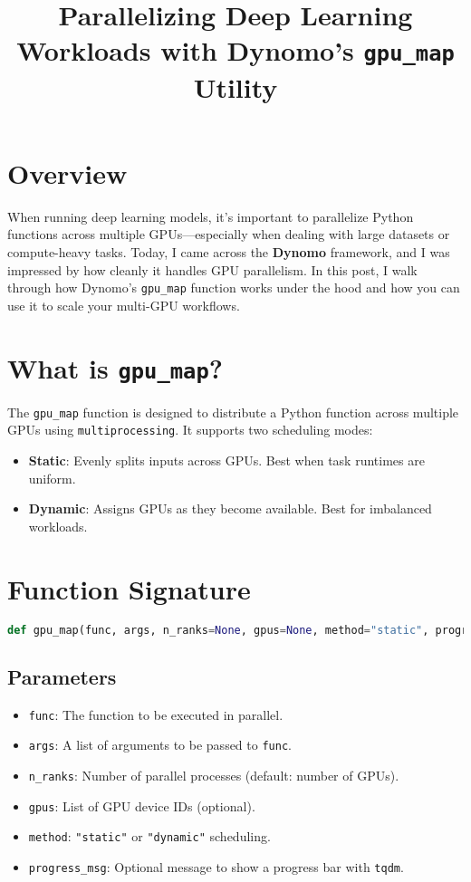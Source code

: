 \documentclass{article}
\title{Parallelizing Deep Learning Workloads with Dynomo's \texttt{gpu\_map} Utility}
\author{}
\date{}
\begin{document}
\maketitle

\section*{Overview}

When running deep learning models, it's important to parallelize Python functions across multiple GPUs—especially when dealing with large datasets or compute-heavy tasks. Today, I came across the \textbf{Dynomo} framework, and I was impressed by how cleanly it handles GPU parallelism. In this post, I walk through how Dynomo's \texttt{gpu\_map} function works under the hood and how you can use it to scale your multi-GPU workflows.

\section*{What is \texttt{gpu\_map}?}

The \texttt{gpu\_map} function is designed to distribute a Python function across multiple GPUs using \texttt{multiprocessing}. It supports two scheduling modes:

\begin{itemize}
  \item \textbf{Static}: Evenly splits inputs across GPUs. Best when task runtimes are uniform.
  \item \textbf{Dynamic}: Assigns GPUs as they become available. Best for imbalanced workloads.
\end{itemize}

\section*{Function Signature}

\begin{lstlisting}[language=Python]
def gpu_map(func, args, n_ranks=None, gpus=None, method="static", progress_msg=None):
\end{lstlisting}

\subsection*{Parameters}

\begin{itemize}
  \item \texttt{func}: The function to be executed in parallel.
  \item \texttt{args}: A list of arguments to be passed to \texttt{func}.
  \item \texttt{n\_ranks}: Number of parallel processes (default: number of GPUs).
  \item \texttt{gpus}: List of GPU device IDs (optional).
  \item \texttt{method}: \texttt{"static"} or \texttt{"dynamic"} scheduling.
  \item \texttt{progress\_msg}: Optional message to show a progress bar with \texttt{tqdm}.
\end{itemize}
\end{document}
